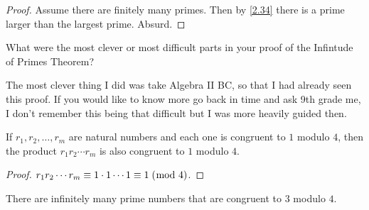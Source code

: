 \documentclass[../main.tex]{subfiles}
\begin{document}
\begin{proof}
  Assume there are finitely many primes. Then by \ref{2.34} there is a prime larger than the largest prime. Absurd.
\end{proof}



\begin{ques} \label{3.36}
  What were the most clever or most difficult parts in your proof of the Infintude of Primes Theorem?
\end{ques}

The most clever thing I did was take Algebra II BC, so that I had already seen this proof. If you would like to know more go back in time and ask 9th grade me, I don't remember this being that difficult but I was more heavily guided then.



\begin{thm} \label{2.37}
  If $r_1, r_2, \ldots, r_m$ are natural numbers and each one is congruent to $1$ modulo $4$, then the product $r_1r_2\cdots r_m$ is also congruent to $1$ modulo $4$.
\end{thm}

\begin{proof}
  $r_1 r_2 \cdots r_m \equiv 1 \cdot 1 \cdots 1 \equiv 1 \; (\bmod \; 4)$.
\end{proof}



\begin{thm} \label{2.38}
  There are infinitely many prime numbers that are congruent to $3$ modulo $4$.
\end{thm}
\end{document}
